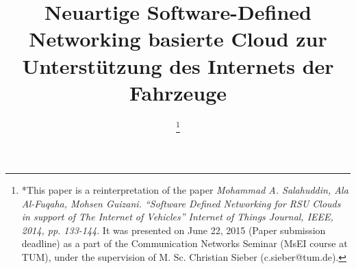 \documentclass[conference]{IEEEtran}
\begin{document}
%
\title{Neuartige Software-Defined Networking basierte Cloud zur Unterstützung des Internets der Fahrzeuge}
%


\author{

\thanks{*This paper is a reinterpretation of the paper \emph{Mohammad A. Salahuddin, Ala Al-Fuqaha, Mohsen Guizani. ``Software Defined Networking for RSU Clouds in support of The Internet of Vehicles'' Internet of Things Journal, IEEE, 2014, pp. 133-144}. It was presented on June 22, 2015 (Paper submission deadline) as a part of the Communication Networks Seminar (MsEI course at TUM), under the supervision of M. Sc. 
Christian Sieber (c.sieber@tum.de).}
}


% 
\end{document}
